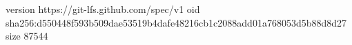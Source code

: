 version https://git-lfs.github.com/spec/v1
oid sha256:d550448f593b509dae53519b4dafe48216cb1c2088add01a768053d5b88d8d27
size 87544
